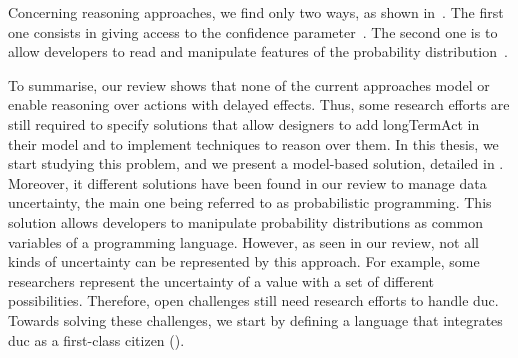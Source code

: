 Concerning reasoning approaches, we find only two ways, as shown in~.
The first one consists in giving access to the confidence parameter~\cite{DBLP:conf/models/BurguenoBMV18, DBLP:conf/ecmdafa/BertoaMBBTV18, DBLP:conf/sle/MayerhoferWV16, DBLP:conf/quatic/VallecilloMO16, DBLP:journals/tkde/BarbaraGP92, DBLP:conf/uist/SchwarzMH11}.
The second one is to allow developers to read and manipulate features of the probability distribution~\cite{baudin2017openturns, DBLP:conf/asplos/BornholtMM14, DBLP:journals/corr/BorgstromGGMG13, osti_1430202, DBLP:journals/peerj-cs/SalvatierWF16, DBLP:conf/popl/BhatAVG12, DBLP:conf/aistats/ChagantyNR13, DBLP:journals/siamsc/JaroszewiczK12, DBLP:journals/toplas/ParkPT08, DBLP:conf/ijcai/Pfeffer01, DBLP:conf/popl/RamseyP02, DBLP:conf/pldi/SankaranarayananCG13, DBLP:conf/icra/Thrun00, DBLP:journals/sac/LunnTBS00, plummer2003jags}.


To summarise, our review shows that none of the current approaches model or enable reasoning over \glspl{action} with delayed effects.
Thus, some research efforts are still required to specify solutions that allow designers to add \gls{longTermAct} in their model and to implement techniques to reason over them.
In this thesis, we start studying this problem, and we present a model-based solution, detailed in .
Moreover, it different solutions have been found in our review to manage data uncertainty, the main one being referred to as probabilistic programming.
This solution allows developers to manipulate probability distributions as common variables of a programming language.
However, as seen in our review, not all kinds of uncertainty can be represented by this approach.
For example, some researchers represent the uncertainty of a value with a set of different possibilities.
Therefore, open challenges still need research efforts to handle \gls{duc}.
Towards solving these challenges, we start by defining a language that integrates \gls{duc} as a first-class citizen (\cf {}).

